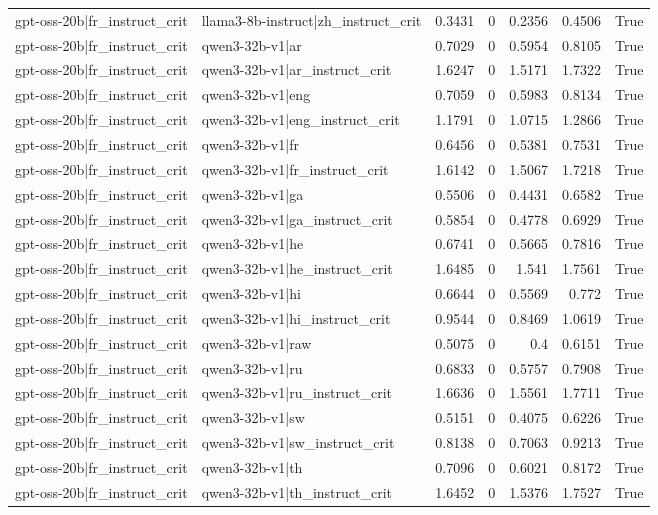 \begin{table}
\begin{tabular}{l l r r r r l}
gpt-oss-20b|fr_instruct_crit & llama3-8b-instruct|zh_instruct_crit & 0.3431 & 0 & 0.2356 & 0.4506 & True \\
gpt-oss-20b|fr_instruct_crit & qwen3-32b-v1|ar & 0.7029 & 0 & 0.5954 & 0.8105 & True \\
gpt-oss-20b|fr_instruct_crit & qwen3-32b-v1|ar_instruct_crit & 1.6247 & 0 & 1.5171 & 1.7322 & True \\
gpt-oss-20b|fr_instruct_crit & qwen3-32b-v1|eng & 0.7059 & 0 & 0.5983 & 0.8134 & True \\
gpt-oss-20b|fr_instruct_crit & qwen3-32b-v1|eng_instruct_crit & 1.1791 & 0 & 1.0715 & 1.2866 & True \\
gpt-oss-20b|fr_instruct_crit & qwen3-32b-v1|fr & 0.6456 & 0 & 0.5381 & 0.7531 & True \\
gpt-oss-20b|fr_instruct_crit & qwen3-32b-v1|fr_instruct_crit & 1.6142 & 0 & 1.5067 & 1.7218 & True \\
gpt-oss-20b|fr_instruct_crit & qwen3-32b-v1|ga & 0.5506 & 0 & 0.4431 & 0.6582 & True \\
gpt-oss-20b|fr_instruct_crit & qwen3-32b-v1|ga_instruct_crit & 0.5854 & 0 & 0.4778 & 0.6929 & True \\
gpt-oss-20b|fr_instruct_crit & qwen3-32b-v1|he & 0.6741 & 0 & 0.5665 & 0.7816 & True \\
gpt-oss-20b|fr_instruct_crit & qwen3-32b-v1|he_instruct_crit & 1.6485 & 0 & 1.541 & 1.7561 & True \\
gpt-oss-20b|fr_instruct_crit & qwen3-32b-v1|hi & 0.6644 & 0 & 0.5569 & 0.772 & True \\
gpt-oss-20b|fr_instruct_crit & qwen3-32b-v1|hi_instruct_crit & 0.9544 & 0 & 0.8469 & 1.0619 & True \\
gpt-oss-20b|fr_instruct_crit & qwen3-32b-v1|raw & 0.5075 & 0 & 0.4 & 0.6151 & True \\
gpt-oss-20b|fr_instruct_crit & qwen3-32b-v1|ru & 0.6833 & 0 & 0.5757 & 0.7908 & True \\
gpt-oss-20b|fr_instruct_crit & qwen3-32b-v1|ru_instruct_crit & 1.6636 & 0 & 1.5561 & 1.7711 & True \\
gpt-oss-20b|fr_instruct_crit & qwen3-32b-v1|sw & 0.5151 & 0 & 0.4075 & 0.6226 & True \\
gpt-oss-20b|fr_instruct_crit & qwen3-32b-v1|sw_instruct_crit & 0.8138 & 0 & 0.7063 & 0.9213 & True \\
gpt-oss-20b|fr_instruct_crit & qwen3-32b-v1|th & 0.7096 & 0 & 0.6021 & 0.8172 & True \\
gpt-oss-20b|fr_instruct_crit & qwen3-32b-v1|th_instruct_crit & 1.6452 & 0 & 1.5376 & 1.7527 & True \\

\end{tabular}
\end{table}
